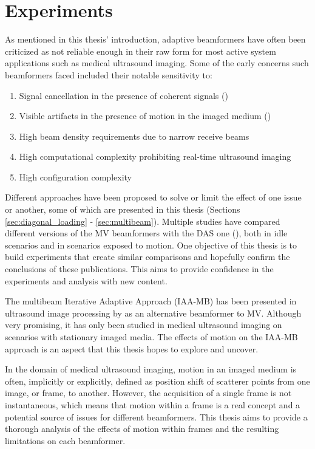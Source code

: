 \chapter{Experiments}
\label{chap:experiments}

As mentioned in this thesis' introduction, adaptive beamformers have often been criticized as not reliable enough in their raw form for most active system applications such as medical ultrasound imaging.
Some of the early concerns such beamformers faced included their notable sensitivity to:
\begin{enumerate}
    \item Signal cancellation in the presence of coherent signals (\cite{van_trees})
    \item Visible artifacts in the presence of motion in the imaged medium (\cite{Asen_shift_invariance})
    \item High beam density requirements due to narrow receive beams
    \item High computational complexity prohibiting real-time ultrasound imaging
    \item High configuration complexity
\end{enumerate}
\noindent
Different approaches have been proposed to solve or limit the effect of one issue or another, some of which are presented in this thesis (Sections \ref{sec:diagonal_loading} - \ref{sec:multibeam}).
Multiple studies have compared different versions of the MV beamformers with the DAS one (\cite{Synnevag_Benefits, Synnevag_adaptive, Asen_shift_invariance}), both in idle scenarios and in scenarios exposed to motion. One objective of this thesis is to build experiments that create similar comparisons and hopefully confirm the conclusions of these publications. This aims to provide confidence in the experiments and analysis with new content.

The multibeam Iterative Adaptive Approach (IAA-MB) has been presented in ultrasound image processing by \cite{Jensen_IAA} as an alternative beamformer to MV. Although very promising, it has only been studied in medical ultrasound imaging on scenarios with stationary imaged media. The effects of motion on the IAA-MB approach is an aspect that this thesis hopes to explore and uncover.

In the domain of medical ultrasound imaging, motion in an imaged medium is often, implicitly or explicitly, defined as position shift of scatterer points from one image, or frame, to another. However, the acquisition of a single frame is not instantaneous, which means that motion within a frame is a real concept and a potential source of issues for different beamformers. This thesis aims to provide a thorough analysis of the effects of motion within frames and the resulting limitations on each beamformer.

